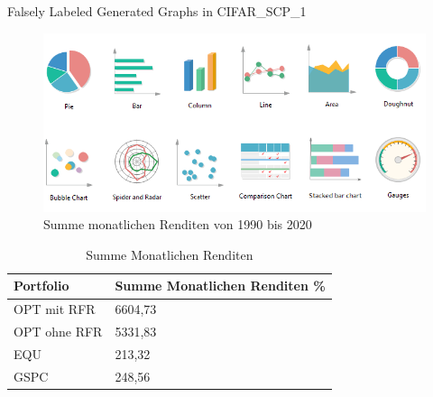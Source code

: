 \documentclass[12pt]{article}
\begin{document}
            Falsely Labeled Generated Graphs in CIFAR\_SCP\_1
        

            \begin{figure}[ht]
            
                \begin{center}

                    \includegraphics[scale=0.5]{types-of-graphs.png}
                    \caption{Summe monatlichen Renditen von 1990 bis 2020}
                    \label{s-m-renditen-fig}
        
                \end{center}
                
            \end{figure}


           

            \begin{table}[htp]
                \begin{center}
                    
                    \begin{tabular}{ | l | l | }

                        \hline
                        \textbf{Portfolio}   & \textbf{Summe Monatlichen Renditen \%} \\
                        \hline
                        OPT mit RFR          &      6604,73 \\            
                        OPT ohne RFR         &      5331,83 \\
                        EQU                  &      213,32 \\                 
                        GSPC                 &      248,56 \\          
                             
                        \hline

                    \end{tabular}
                    \caption{Summe Monatlichen Renditen}
                    \label{s-m-renditen-tab}
                \end{center}
            \end{table}
\end{document}
